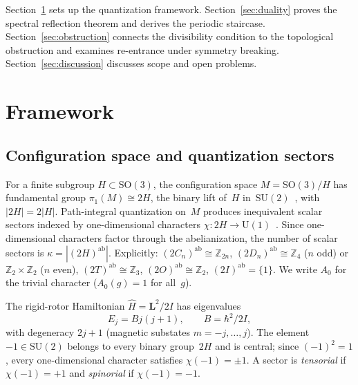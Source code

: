 \documentclass[12pt]{article}
\theoremstyle{definition}
\theoremstyle{remark}
\newcommand{\ZZ}{\mathbb{Z}}
\newcommand{\SU}{\mathrm{SU}}
\newcommand{\SO}{\mathrm{SO}}
\newcommand{\UU}{\mathrm{U}}
\begin{document}
Section~\ref{sec:framework} sets up the quantization framework.
Section~\ref{sec:duality} proves the spectral reflection theorem
and derives the periodic staircase.
Section~\ref{sec:obstruction} connects the divisibility condition
to the topological obstruction and examines re-entrance under
symmetry breaking.
Section~\ref{sec:discussion} discusses scope and open problems.

\section{Framework}
\label{sec:framework}

\subsection{Configuration space and quantization sectors}
\label{sec:config}

For a finite subgroup $H \subset \SO(3)$, the configuration
space $M = \SO(3)/H$ has fundamental group
$\pi_1(M) \cong 2H$, the binary lift of~$H$
in~$\SU(2)$~\cite{Mermin1979}, with $|2H| = 2|H|$.
Path-integral quantization on~$M$ produces inequivalent
scalar sectors indexed by one-dimensional characters
$\chi \colon 2H \to \UU(1)$~\cite{Schulman1968, LaidlawDeWitt1971,
ImboSudarshan1988, FinkelsteinRubinstein1968,
Giulini1995, BalachandranEtAl1983, Mouchet2021}.
Since one-dimensional characters factor through the
abelianization, the number of scalar sectors is
$\kappa = |(2H)^{\mathrm{ab}}|$.
Explicitly: $(2C_n)^{\mathrm{ab}} \cong \ZZ_{2n}$,
$(2D_n)^{\mathrm{ab}} \cong \ZZ_4$ ($n$ odd) or
$\ZZ_2 \times \ZZ_2$ ($n$ even),
$(2T)^{\mathrm{ab}} \cong \ZZ_3$,
$(2O)^{\mathrm{ab}} \cong \ZZ_2$,
$(2I)^{\mathrm{ab}} = \{1\}$.
We write $A_0$ for the trivial character
($A_0(g) = 1$ for all~$g$).

The rigid-rotor Hamiltonian $\hat{H} = \mathbf{L}^2/2I$ has
eigenvalues
\begin{equation}
  \label{eq:energy}
  E_j = Bj(j{+}1), \qquad B = \hbar^2/2I,
\end{equation}
with degeneracy $2j{+}1$ (magnetic substates
$m = -j, \ldots, j$).
The element $-1 \in \SU(2)$ belongs to every binary
group~$2H$ and is central; since $(-1)^2 = 1$, every
one-dimensional character satisfies $\chi(-1) = \pm 1$.
A sector is \emph{tensorial} if $\chi(-1) = +1$ and
\emph{spinorial} if $\chi(-1) = -1$.
\end{document}
